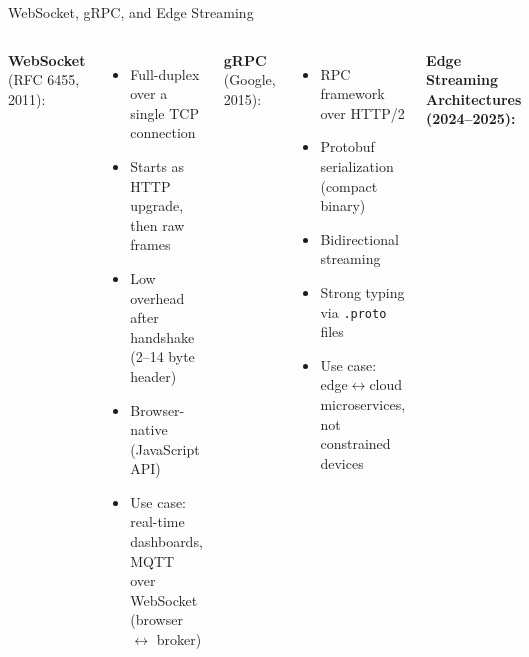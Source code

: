 \documentclass[aspectratio=169,11pt]{beamer}
\begin{document}
\begin{frame}{WebSocket, gRPC, and Edge Streaming}
    \begin{columns}
        \textbf{WebSocket} (RFC 6455, 2011):
        \begin{itemize}
            \item Full-duplex over a single TCP connection
            \item Starts as HTTP upgrade, then raw frames
            \item Low overhead after handshake (2--14 byte header)
            \item Browser-native (JavaScript API)
            \item Use case: real-time dashboards, MQTT over WebSocket (browser $\leftrightarrow$ broker)
        \end{itemize}
        
        \vspace{0.2cm}
        \textbf{gRPC} (Google, 2015):
        \begin{itemize}
            \item RPC framework over HTTP/2
            \item Protobuf serialization (compact binary)
            \item Bidirectional streaming
            \item Strong typing via \texttt{.proto} files
            \item Use case: edge$\leftrightarrow$cloud microservices, not constrained devices
        \end{itemize}
        
        \textbf{Edge Streaming Architectures (2024--2025):}
        
        \vspace{0.2cm}
        \begin{center}
        \end{center}
        

\end{columns}
\end{frame}
\end{document}
